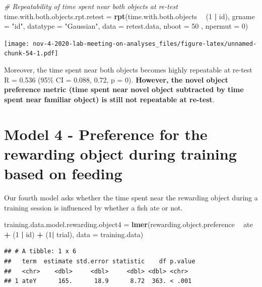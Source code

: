 \documentclass[]{book}
\newenvironment{Shaded}{\begin{snugshade}}{\end{snugshade}}
\newcommand{\KeywordTok}[1]{\textcolor[rgb]{0.13,0.29,0.53}{\textbf{#1}}}
\newcommand{\DataTypeTok}[1]{\textcolor[rgb]{0.13,0.29,0.53}{#1}}
\newcommand{\DecValTok}[1]{\textcolor[rgb]{0.00,0.00,0.81}{#1}}
\newcommand{\StringTok}[1]{\textcolor[rgb]{0.31,0.60,0.02}{#1}}
\newcommand{\CommentTok}[1]{\textcolor[rgb]{0.56,0.35,0.01}{\textit{#1}}}
\newcommand{\OperatorTok}[1]{\textcolor[rgb]{0.81,0.36,0.00}{\textbf{#1}}}
\newcommand{\NormalTok}[1]{#1}
\begin{document}
\begin{Shaded}
\begin{Highlighting}[]
\CommentTok{# Repeatability of time spent near both objects at re-test }
\NormalTok{time.with.both.objects.rpt.retest =}\StringTok{ }
\StringTok{  }\KeywordTok{rpt}\NormalTok{(time.with.both.objects }\OperatorTok{~}\StringTok{ }\NormalTok{(}\DecValTok{1} \OperatorTok{|}\StringTok{ }\NormalTok{id), }\DataTypeTok{grname =} \StringTok{"id"}\NormalTok{, }\DataTypeTok{datatype =} \StringTok{"Gaussian"}\NormalTok{, }
      \DataTypeTok{data =}\NormalTok{ retest.data, }\DataTypeTok{nboot =} \DecValTok{50}\NormalTok{ , }\DataTypeTok{npermut =} \DecValTok{0}\NormalTok{) }
\end{Highlighting}
\end{Shaded}

\texttt{[image: nov-4-2020-lab-meeting-on-analyses\_files/figure-latex/unnamed-chunk-54-1.pdf]}

Moreover, the time spent near both objects becomes highly repeatable at
re-test R = 0.536 (95\% CI = 0.088, 0.72, p = 0). \textbf{However, the
novel object preference metric (time spent near novel object subtracted
by time spent near familiar object) is still not repeatable at re-test}.

\chapter{Model 4 - Preference for the rewarding object during training
based on
feeding}\label{model-4---preference-for-the-rewarding-object-during-training-based-on-feeding}

Our fourth model asks whether the time spent near the rewarding object
during a training session is influenced by whether a fish ate or not.

\begin{Shaded}
\begin{Highlighting}[]
\NormalTok{training.data.model.rewarding.object4 =}\StringTok{ }
\StringTok{  }\KeywordTok{lmer}\NormalTok{(rewarding.object.preference }\OperatorTok{~}\StringTok{ }\NormalTok{ate }\OperatorTok{+}\StringTok{ }\NormalTok{(}\DecValTok{1} \OperatorTok{|}\StringTok{ }\NormalTok{id) }\OperatorTok{+}\StringTok{ }\NormalTok{(}\DecValTok{1}\OperatorTok{|}\StringTok{ }\NormalTok{trial), }
       \DataTypeTok{data =}\NormalTok{ training.data)}
\end{Highlighting}
\end{Shaded}

\begin{verbatim}
## # A tibble: 1 x 6
##   term  estimate std.error statistic    df p.value
##   <chr>    <dbl>     <dbl>     <dbl> <dbl> <chr>  
## 1 ateY      165.      18.9      8.72  363. < .001
\end{verbatim}
\end{document}
